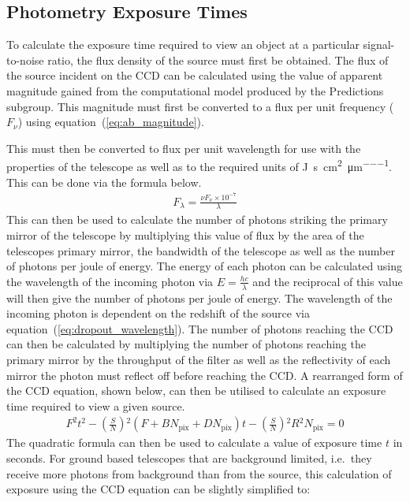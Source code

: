 	\subsection{Photometry Exposure Times} %
	\label{sub:calculating_exposure_time}
		To calculate the exposure time required to view an object at a particular signal-to-noise ratio, the flux density of the source must first be obtained. The flux of the source incident on the CCD can be calculated using the value of apparent magnitude gained from the computational model produced by the Predictions subgroup. This magnitude must first be converted to a flux per unit frequency ($F_\nu$) using equation~(\ref{eq:ab_magnitude}).

		This must then be converted to flux per unit wavelength for use with the properties of the telescope as well as to the required units of \si{\joule\per\second\per\square\centi\metre\per\micro\metre}. This can be done via the formula below. %
		\begin{align}
			F_\lambda = \frac{\nu F_\nu \times 10^{-7}}{\lambda} \label{eq:flux_per_unit_frequency}
		\end{align}
		This can then be used to calculate the number of photons striking the primary mirror of the telescope by multiplying this value of flux by the area of the telescopes primary mirror, the bandwidth of the telescope as well as the number of photons per joule of energy. The energy of each photon can be calculated using the wavelength of the incoming photon via $E = \frac{hc}{\lambda}$ and the reciprocal of this value will then give the number of photons per joule of energy. The wavelength of the incoming photon is dependent on the redshift of the source via equation~(\ref{eq:dropout_wavelength}). The number of photons reaching the CCD can then be calculated by multiplying the number of photons reaching the primary mirror by the throughput of the filter as well as the reflectivity of each mirror the photon must reflect off before reaching the CCD. A rearranged form of the CCD equation, shown below, can then be utilised to calculate an exposure time required to view a given source.
		\begin{align}
			F^2 t^2 - (\frac{S}{N}){^2}(F + BN_\text{pix} + DN_\text{pix})t - (\frac{S}{N}){^2}R{^2}N_\text{pix} = 0
		\end{align}
		The quadratic formula can then be used to calculate a value of exposure time $t$ in seconds. For ground based telescopes that are background limited, i.e.\ they receive more photons from background than from the source, this calculation of exposure using the CCD equation can be slightly simplified to:
